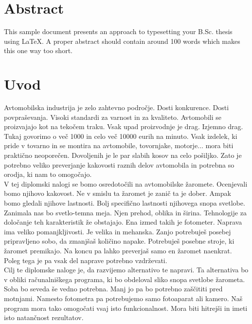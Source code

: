 \documentclass[oneside, a4paper, 12pt]{book}
\newcommand{\clearemptydoublepage}{\newpage{\pagestyle{empty}\cleardoublepage}}
\begin{document}
\chapter*{Abstract}
This sample document presents an approach to typesetting your B.Sc. thesis using \LaTeX. A proper abstract should contain around 100 words which makes this one way too short.
\clearemptydoublepage

\mainmatter
\setcounter{page}{1}
\pagestyle{fancy}

\chapter{Uvod}
Avtomobilska industrija je zelo zahtevno področje. Dosti konkurence. Dosti povpraševanja. Visoki standardi za varnost in za kvaliteto. Avtomobili se proizvajajo kot na tekočem traku. Vsak upad proizvodnje je drag. Izjemno drag. Tukaj govorimo o več 1000 in celo več 10000 eurih na minuto. Vsak izdelek, ki pride v tovarno in se montira na avtomobile, tovornjake, motorje... mora biti praktično neoporečen. Dovoljenih je le par slabih kosov na celo pošiljko. Zato je potrebno veliko preverjanje kakovosti raznih delov avtomobila in potrebna so orodja, ki nam to omogočajo.\\
V tej diplomski nalogi se bomo osredotočili na avtomobilske žaromete. Ocenjevali bomo njihovo kakovost. Ne v smislu ta žaromet je zanič ta je dober. Ampak bomo gledali njihove lastnosti. Bolj specifično lastnosti njihovega snopa svetlobe. \\
Zanimala nas bo svetlo-temna meja. Njen prehod, oblika in širina. Tehnologije za določanje teh karakteristik že obstajajo. Ena izmed takih je fotometer. Naprava ima veliko pomanjkljivosti. Je velika in mehanska. Zanjo potrebuješ posebej pripravljeno sobo, da zmanjšaš količino napake. Potrebuješ posebne stroje, ki žaromet premikajo. Na koncu pa lahko preverjaš samo en žaromet naenkrat. Poleg tega je pa vsak del naprave potrebno vzdrževati.\\
Cilj te diplomske naloge je, da razvijemo alternativo te napravi. Ta alternativa bo v obliki računalniškega programa, ki bo obdeloval sliko snopa svetlobe žarometa. Soba bo seveda še vedno potrebna. Manj jo pa bo potrebno zaščititi pred motnjami. Namesto fotometra pa potrebujemo samo fotoaparat ali kamero. Naš program mora tako omogočati vsaj isto funkcionalnost. Mora biti hitrejši in imeti isto natančnost rezultatov.\\
\end{document}
